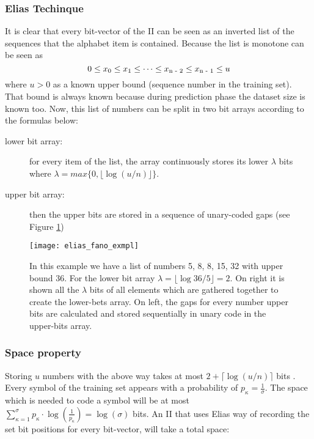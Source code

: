 \subsubsection*{Elias Techinque}
\par It is clear that every bit-vector of the II can be seen as an inverted list of the sequences that the alphabet item is contained. Because the list is monotone can be seen as \[0 \leq x\textsubscript{0} \leq x\textsubscript{1} \leq \dots \leq x\textsubscript{n - 2} \leq x\textsubscript{n - 1} \leq u \] where \(u > 0 \) as a known upper bound (sequence number in the training set). That bound is always known because during prediction phase the dataset size is known too. Now, this list of numbers can be split in two bit arrays according to the formulas below:
	\begin{description}
  	\item[lower bit array:] for every item of the list, the array continuously stores its lower $\lambda$ bits where \(\lambda = max\{0, \lfloor \log(u/n)\rfloor\}\).
  	\item[upper bit array:] then the upper bits are stored in a sequence of unary-coded gaps (see Figure \ref{fig:ef_ex})
	\end{description}

\begin{figure}[h]
    \centering
    \texttt{[image: elias\_fano\_exmpl]}
    \caption{In this example we have a list of numbers 5, 8, 8, 15, 32 with upper bound 36. For the lower bit array \(\lambda = \lfloor \log36/5\rfloor = 2\). On right it is shown all the \(\lambda\) bits of all elements which are gathered together to create the lower-bets array. On left, the gaps for every number upper bits are calculated and stored sequentially in unary code in the upper-bits array.}
    \label{fig:ef_ex}
\end{figure}	
\subsubsection*{Space property}
\par Storing $u$ numbers with the above way takes at most \(2 + \lceil\log(u/n)\rceil\) bits \cite{vigna_quasi-succinct_2013}. Every symbol of the training set appears with a probability of \(p_{\kappa} = \frac{1}{\sigma} \). The space which is needed to code a symbol will be at most\( \sum_{\kappa = 1}^{\sigma} p_{\kappa} \cdot \log(\frac{1}{p_{\kappa}}) = \log(\sigma)\) bits. An II that uses Elias way of recording the set bit positions for every bit-vector, will take a total space:

